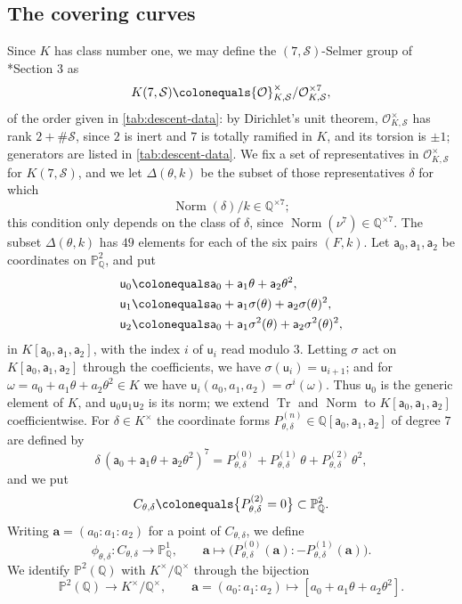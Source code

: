 \documentclass[12pt]{amsart}
\renewcommand{\P}{\mathbb{P}}
\newcommand{\PP}{{\mathbb P}}
\newcommand{\Q}{\mathbb{Q}}
\newcommand{\Pone}{\P^{1}}
\newcommand{\calS}{{\mathcal S}}
\newcommand{\OO}{{\mathcal O}}
\newcommand{\OKS}{\OO_{K,\calS}}
\newcommand{\sfa}{\mathsf{a}}
\newcommand{\sfu}{\mathsf{u}}
\DeclareMathOperator{\Norm}{Norm}
\DeclareMathOperator{\Tr}{Tr}
\newcommand{\cdef}[1]{{\color{blue} \textsf{#1}}} %
\numberwithin{equation}{section}
\theoremstyle{definition}
\begin{document}
\subsection{The covering curves}
Since $K$ has class number one, we may define the \cdef{$(7,\calS)$-Selmer group} of
\cite{Bruin06-nn2}*{Section 3} as
\[
  K(7,\calS) \colonequals \OKS^{\times}/\OKS^{\times 7},
\]
of the order given in \cref{tab:descent-data}: by Dirichlet's unit theorem,
$\OKS^{\times}$ has rank $2 + \#\calS$, since $2$ is inert and $7$ is totally
ramified in $K$, and its torsion is $\pm 1$; generators are listed in
\cref{tab:descent-data}. We fix a set of representatives
in $\OKS^{\times}$ for $K(7,\calS)$, and we let $\Delta(\theta,k)$ be the subset of those
representatives $\delta$ for which
\[
  \Norm(\delta)/k \in \Q^{\times 7} ;
\]
this condition only depends on the class of $\delta$, since $\Norm(\nu^7) \in
\Q^{\times 7}$. The subset $\Delta(\theta,k)$ has $49$ elements for each of the six pairs
$(F,k)$. Let $\sfa_0,\sfa_1,\sfa_2$ be coordinates on $\PP^2_{\Q}$, and put
\begin{align*}
  \sfu_0 &\colonequals \sfa_0 + \sfa_1\theta + \sfa_2\theta^{2}, \\
  \sfu_1 &\colonequals \sfa_0 + \sfa_1\sigma(\theta) + \sfa_2\sigma(\theta)^{2}, \\
  \sfu_2 &\colonequals \sfa_0 + \sfa_1\sigma^{2}(\theta) + \sfa_2\sigma^{2}(\theta)^{2},
\end{align*}
in $K[\sfa_0,\sfa_1,\sfa_2]$, with the index $i$ of $\sfu_i$ read modulo $3$.
Letting $\sigma$ act on $K[\sfa_0,\sfa_1,\sfa_2]$ through the coefficients, we
have $\sigma(\sfu_i) = \sfu_{i+1}$; and for $\omega = a_0 + a_1\theta +
a_2\theta^2 \in K$ we have $\sfu_i(a_0,a_1,a_2) = \sigma^{i}(\omega)$. Thus
$\sfu_0$ is the \cdef{generic element} of $K$, and $\sfu_0\sfu_1\sfu_2$ is its norm; we
extend $\Tr$ and $\Norm$ to $K[\sfa_0,\sfa_1,\sfa_2]$ coefficientwise. For
$\delta \in K^{\times}$ the \cdef{coordinate forms}
$P^{(n)}_{\theta,\delta} \in \Q[\sfa_0,\sfa_1,\sfa_2]$ of degree $7$ are
defined by
\begin{equation}
  \label{eq:P-forms}
  \delta\,(\sfa_0+\sfa_1\theta + \sfa_2\theta^2)^{7}
  = P^{(0)}_{\theta,\delta} + P^{(1)}_{\theta,\delta}\,\theta + P^{(2)}_{\theta,\delta}\,\theta^{2},
\end{equation}
and we put
\begin{equation}
  \label{eq:C-and-phi}
  C_{\theta,\delta} \colonequals \bigl\{P^{(2)}_{\theta,\delta} = 0\bigr\} \subset \PP^2_{\Q} .
\end{equation}
Writing $\mathbf{a} = (a_0:a_1:a_2)$ for a point of $C_{\theta,\delta}$, we
define
\begin{equation}
  \label{eq:phi}
  \phi_{\theta,\delta} \colon C_{\theta,\delta} \to \Pone_{\Q},
  \qquad \mathbf{a} \mapsto
  \bigl(P^{(0)}_{\theta,\delta}(\mathbf{a}) : -P^{(1)}_{\theta,\delta}(\mathbf{a})\bigr).
\end{equation}
We identify $\PP^2(\Q)$ with $K^{\times}/\Q^{\times}$ through the bijection
\begin{equation}
  \label{eq:P2=K*/Q*}
  \PP^2(\Q) \to K^{\times}/\Q^{\times}, \qquad \mathbf{a} = (a_0:a_1:a_2) \mapsto [a_0 + a_1\theta + a_2\theta^2] .
\end{equation}
\end{document}

